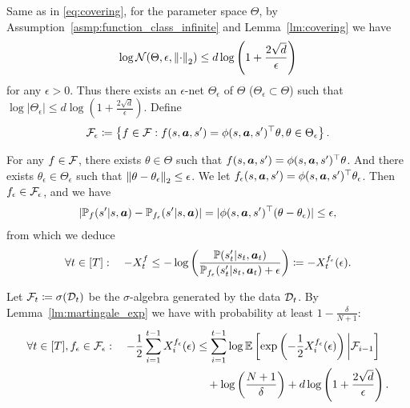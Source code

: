 Same as in \eqref{eq:covering}, for the parameter space $\Theta$, by Assumption~\ref{asmp:function_class_infinite} and Lemma~\ref{lm:covering} we have
\begin{align}\label{eq:covering_mg_infinite}
    \log {\mathcal{N}}(\Theta,\epsilon,\left\| \cdot \right\|_2)\leq d\log\left(1+\frac{2\sqrt{d}}{\epsilon}\right)
\end{align}
for any $\epsilon>0$. Thus there exists an $\epsilon$-net $\Theta_\epsilon$ of $\Theta$ ($\Theta_\epsilon\subset\Theta$) such that $\log|\Theta_\epsilon|\leq d\log\left(1+\frac{2\sqrt{d}}{\epsilon}\right)$.
Define
\begin{align*}
    {\mathcal{F}}_\epsilon \coloneqq \left\{f\in{\mathcal{F}}: f(s,{\bm{a}},s')=\phi(s,{\bm{a}},s')^\top\theta,\theta\in\Theta_\epsilon\right\}.
\end{align*}


For any $f\in{\mathcal{F}}$, there exists $\theta\in\Theta$ such that $f(s,{\bm{a}},s')=\phi(s,{\bm{a}},s')^\top\theta$. And there exists $\theta_\epsilon\in\Theta_\epsilon$ such that $\left\| \theta-\theta_\epsilon \right\|_2\leq \epsilon$. We let $f_\epsilon(s,{\bm{a}},s')=\phi(s,{\bm{a}},s')^\top\theta_\epsilon$. Then $f_\epsilon\in{\mathcal{F}}_\epsilon$, and we have
\begin{align}\label{eq:diff_eps_infinite}
    |{\mathbb P}_f(s'|s,{\bm{a}})-{\mathbb P}_{f_\epsilon}(s'|s,{\bm{a}})|=|\phi(s,{\bm{a}},s')^\top(\theta-\theta_\epsilon)|\leq \epsilon,
\end{align}
from which we deduce
\begin{align}\label{eq:diff_net_approx_infinite}
    \forall t\in[T]:\quad -X_t^f\leq -\log\left(\frac{{\mathbb P}(s'_t|s_t,{\bm{a}}_t)}{{\mathbb P}_{f_\epsilon}(s'_t|s_t,{\bm{a}}_t)+\epsilon}\right)\coloneqq -X_t^{f_\epsilon}(\epsilon).
\end{align}

Let ${\mathcal{F}}_t\coloneqq \sigma({\mathcal{D}}_t)$ be the $\sigma$-algebra generated by the data ${\mathcal{D}}_t$. 
By Lemma~\ref{lm:martingale_exp} we have 
with probability at least $1-\frac{\delta}{N+1}$:
\begin{align}\label{eq:exp_concentration_net_infinite}
   \forall t\in[T],f_\epsilon\in{\mathcal{F}}_\epsilon: \quad -\frac{1}{2}\sum_{i=1}^{t-1} X^{f_\epsilon}_i(\epsilon) &\leq \sum_{i=1}^{t-1} \log\mathbb{E}\left[\exp\left(-\frac{1}{2}X^{f_\epsilon}_i(\epsilon)\right)\bigg|{\mathcal{F}}_{i-1}\right] \notag\\
   &\quad+ \log\left(\frac{N+1}{\delta}\right) + d\log\left(1+\frac{2\sqrt{d}}{\epsilon}\right).
\end{align}

